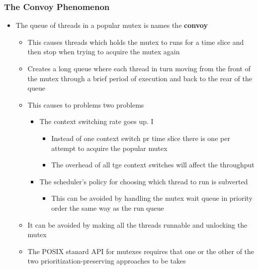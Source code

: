 \documentclass[11pt]{article}
\providecommand{\tightlist}{%
      \setlength{\itemsep}{0pt}\setlength{\parskip}{0pt}}
\begin{document}
    \subsubsection{The Convoy Phenomenon}\label{the-convoy-phenomenon}

\begin{itemize}
\tightlist
\item
  The queue of threads in a popular mutex is names the \textbf{convoy}

  \begin{itemize}
  \tightlist
  \item
    This causes threads which holds the mutex to runs for a time slice
    and then stop when trying to acquire the mutex again
  \item
    Creates a long queue where each thread in turn moving from the front
    of the mutex through a brief period of execution and back to the
    rear of the queue
  \item
    This causes to problems two problems

    \begin{itemize}
    \tightlist
    \item
      The context switching rate goes up. I

      \begin{itemize}
      \tightlist
      \item
        Instead of one context switch pr time slice there is one per
        attempt to acquire the popular mutex
      \item
        The overhead of all tge context switches will affect the
        throughput
      \end{itemize}
    \item
      The scheduler's policy for choosing which thread to run is
      subverted

      \begin{itemize}
      \tightlist
      \item
        This can be avoided by handling the mutex wait queue in priority
        order the same way as the run queue
      \end{itemize}
    \end{itemize}
  \item
    It can be avoided by making all the threads runnable and unlocking
    the mutex
  \item
    The POSIX stanard API for mutexes requires that one or the other of
    the two prioritization-preserving approaches to be takes
  \end{itemize}
\end{itemize}
\end{document}
